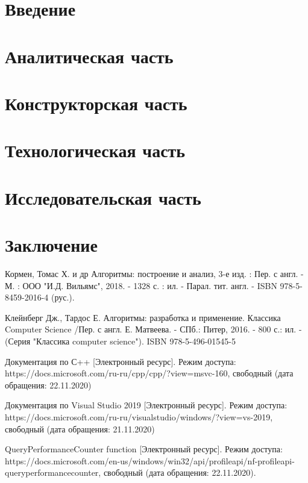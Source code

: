 \documentclass[12pt]{report}
\begin{document}
	\renewcommand\bibname{Список литературы}
	
	
	
	\tableofcontents
	\newpage
	
	\chapter*{Введение}
	
	\newpage
	
	\chapter{Аналитическая часть}
	
	\newpage
	
	\chapter{Конструкторская часть}
	
	\newpage
	
	\chapter{Технологическая часть}
	
	\newpage
	
	\chapter{Исследовательская часть}
	
	\newpage
	
	\chapter*{Заключение}
	
	\newpage
	
	\begin{thebibliography}{2}
		
		 Кормен, Томас Х. и др Алгоритмы: построение и анализ, 3-е изд. : Пер. с англ. - М. : ООО "И.Д. Вильямс", 2018. - 1328 с. : ил. - Парал. тит. англ. -  ISBN 978-5-8459-2016-4 (рус.).
		
		 Клейнберг Дж., Тардос Е. Алгоритмы: разработка и применение. Классика Computer Science /Пер. с англ. Е. Матвеева. - СПб.: Питер, 2016. - 800 с.: ил. - (Серия "Классика computer science"). ISBN 978-5-496-01545-5
		
		 Документация по С++  [Электронный ресурс]. Режим доступа: https://docs.microsoft.com/ru-ru/cpp/cpp/?view=msvc-160, свободный (дата обращения: 22.11.2020)
		
		 Документация по Visual Studio 2019 [Электронный ресурс]. Режим доступа: https://docs.microsoft.com/ru-ru/visualstudio/windows/?view=vs-2019, свободный (дата обращения: 21.11.2020)	
		
		 QueryPerformanceCounter function [Электронный ресурс]. Режим доступа: https://docs.microsoft.com/en-us/windows/win32/api/profileapi/nf-profileapi-queryperformancecounter, свободный (дата обращения: 22.11.2020).
	\end{thebibliography}
\end{document}
